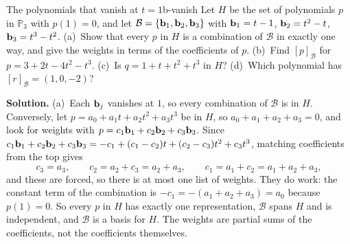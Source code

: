 \documentclass[11pt]{article}
\begin{document}
\begin{exmp}{The polynomials that vanish at $t=1$}{b-vanish}
Let $H$ be the set of polynomials $p$ in $\mathbb{P}_3$ with $p(1)=0$, and let $\mathcal{B}=\{\mathbf{b}_1,\mathbf{b}_2,\mathbf{b}_3\}$ with $\mathbf{b}_1=t-1$, $\mathbf{b}_2=t^2-t$, $\mathbf{b}_3=t^3-t^2$. (a)~Show that every $p$ in $H$ is a combination of $\mathcal{B}$ in exactly one way, and give the weights in terms of the coefficients of $p$. (b)~Find $[p]_{\mathcal{B}}$ for $p=3+2t-4t^2-t^3$. (c)~Is $q=1+t+t^2+t^3$ in $H$? (d)~Which polynomial has $[r]_{\mathcal{B}}=(1,0,-2)$?

\textbf{Solution.} (a)~Each $\mathbf{b}_j$ vanishes at $1$, so every combination of $\mathcal{B}$ is in $H$. Conversely, let $p=a_0+a_1t+a_2t^2+a_3t^3$ be in $H$, so $a_0+a_1+a_2+a_3=0$, and look for weights with $p=c_1\mathbf{b}_1+c_2\mathbf{b}_2+c_3\mathbf{b}_3$. Since $c_1\mathbf{b}_1+c_2\mathbf{b}_2+c_3\mathbf{b}_3=-c_1+(c_1-c_2)t+(c_2-c_3)t^2+c_3t^3$, matching coefficients from the top gives
\[
c_3=a_3,\qquad c_2=a_2+c_3=a_2+a_3,\qquad c_1=a_1+c_2=a_1+a_2+a_3,
\]
and these are forced, so there is at most one list of weights. They do work: the constant term of the combination is $-c_1=-(a_1+a_2+a_3)=a_0$ because $p(1)=0$. So every $p$ in $H$ has exactly one representation, $\mathcal{B}$ spans $H$ and is independent, and $\mathcal{B}$ is a basis for $H$. The weights are partial sums of the coefficients, not the coefficients themselves.


\end{exmp}
\end{document}
